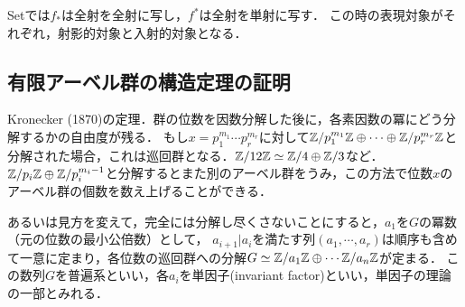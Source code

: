 \documentclass[uplatex,dvipdfmx]{jsreport}
\begin{document}
\begin{tcolorbox}[colframe=ForestGreen, colback=ForestGreen!10!white,breakable,colbacktitle=ForestGreen!40!white,coltitle=black,fonttitle=\bfseries\sffamily,
title=入射的対象は俺の霊性]
    Setでは$f_*$は全射を全射に写し，$f^*$は全射を単射に写す．
    この時の表現対象がそれぞれ，射影的対象と入射的対象となる．
\end{tcolorbox}

\subsection{有限アーベル群の構造定理の証明}

\begin{tcolorbox}[colframe=ForestGreen, colback=ForestGreen!10!white,breakable,colbacktitle=ForestGreen!40!white,coltitle=black,fonttitle=\bfseries\sffamily,
title=structure theorem of finite abelian group]
    Kronecker (1870)の定理．群の位数を因数分解した後に，各素因数の冪にどう分解するかの自由度が残る．
    もし$x=p_1^{m_1}\cdots p_r^{m_r}$に対して$\mathbb{Z}/p_1^{m_1}\mathbb{Z}\oplus\cdots\oplus\mathbb{Z}/p_r^{m_r}\mathbb{Z}$と分解された場合，これは巡回群となる．$\mathbb{Z}/12\mathbb{Z}\simeq\mathbb{Z}/4\oplus\mathbb{Z}/3$など．
    $\mathbb{Z}/p_i\mathbb{Z}\oplus\mathbb{Z}/p_i^{m_i-1}$と分解するとまた別のアーベル群をうみ，この方法で位数$x$のアーベル群の個数を数え上げることができる．

    あるいは見方を変えて，完全には分解し尽くさないことにすると，$a_1$を$G$の冪数（元の位数の最小公倍数）として，
    $a_{i+1}|a_i$を満たす列$(a_1,\cdots,a_r)$は順序も含めて一意に定まり，各位数の巡回群への分解$G\simeq\mathbb{Z}/a_1\mathbb{Z}\oplus\cdots\mathbb{Z}/a_n\mathbb{Z}$が定まる．
    この数列$G$を普遍系といい，各$a_i$を単因子(invariant factor)といい，単因子の理論の一部とみれる．
\end{tcolorbox}
\end{document}
